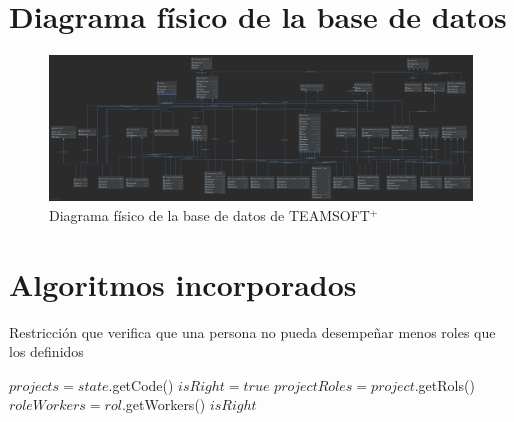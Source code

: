 {\chapter{Diagrama físico de la base de datos}
\begin{figure}[H]
	\centering
	\includegraphics[width=\textwidth]{figuras/diagrama-base-datos.png}
	\caption{Diagrama físico de la base de datos de TEAMSOFT$^+$} \label{fig:diagrama-bd}
\end{figure}



\chapter{Algoritmos incorporados}


\begin{algorithm}[H]
	\caption{Restricción que verifica que una persona no pueda desempeñar menos roles que los definidos}
	\label{alg:rest-min-roles}
	$projects = state$.getCode()\;
	$isRight = true$\;
	{$projectRoles = project$.getRols() 
		{
			$roleWorkers = rol$.getWorkers() 
			{
			}
			 \Break
		}
		 \Break
	}
	\Return $isRight$
\end{algorithm}

\clearpage

}
